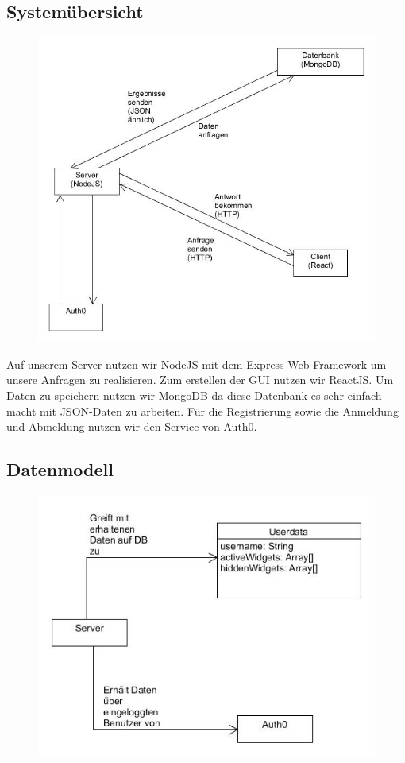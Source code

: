 	\subsection{Systemübersicht}
		\begin{figure}[H]
			\includegraphics[scale=0.6]{images/SYCArchitektur}
		\end{figure}
	
	Auf unserem Server nutzen wir NodeJS mit dem Express Web-Framework um unsere Anfragen zu realisieren. Zum erstellen der GUI
	nutzen wir ReactJS. Um Daten zu speichern nutzen wir MongoDB da diese Datenbank es sehr einfach macht mit JSON-Daten zu arbeiten.
	Für die Registrierung sowie die Anmeldung und Abmeldung nutzen wir den Service von Auth0.
	
	\subsection{Datenmodell}
	
		\begin{figure}[H]
			\includegraphics[scale=0.6]{images/Datenmodell}
		\end{figure}
	

